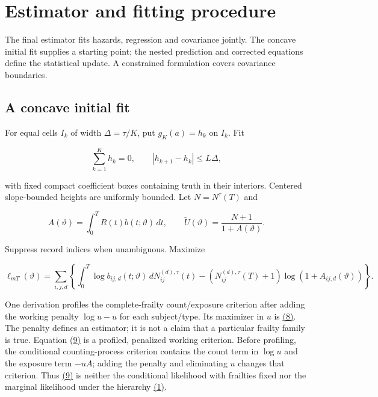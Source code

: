 \documentclass[11pt]{article}
\begin{document}
\section{Estimator and fitting procedure}\label{sec:3}

The final estimator fits hazards, regression and covariance jointly. The concave initial fit supplies a starting point; the nested prediction and corrected equations define the statistical update. A constrained formulation covers covariance boundaries.

\subsection{A concave initial fit}\label{sec:3.1}

For equal cells \(I_k\) of width \(\Delta=\tau/K\), put \(g_K(a)=h_k\) on \(I_k\). Fit

\begin{equation*}
\sum_{k=1}^K h_k=0,\qquad |h_{k+1}-h_k|\leq L\Delta,\tag{7}\label{eq:7}
\end{equation*}

with fixed compact coefficient boxes containing truth in their interiors. Centered slope-bounded heights are uniformly bounded. Let \(N=N^\tau(T)\) and

\begin{equation*}
A(\vartheta)=\int_0^T R(t)b(t;\vartheta)\,dt,\qquad
\widetilde U(\vartheta)=\frac{N+1}{1+A(\vartheta)}.
\tag{8}\label{eq:8}
\end{equation*}

Suppress record indices when unambiguous. Maximize

\begin{equation*}
\ell_{mT}(\vartheta)=
\sum_{i,j,d}\left\{\int_0^T\log b_{ij,d}(t;\vartheta)\,dN_{ij}^{(d),\tau}(t)
-(N_{ij}^{(d),\tau}(T)+1)\log(1+A_{ij,d}(\vartheta))\right\}.
\tag{9}\label{eq:9}
\end{equation*}

One derivation profiles the complete-frailty count/exposure criterion after adding the working penalty \(\log u-u\) for each subject/type. Its maximizer in \(u\) is \hyperref[eq:8]{(8)}. The penalty defines an estimator; it is not a claim that a particular frailty family is true. Equation \hyperref[eq:9]{(9)} is a profiled, penalized working criterion. Before profiling, the conditional counting-process criterion contains the count term in \(\log u\) and the exposure term \(-uA\); adding the penalty and eliminating \(u\) changes that criterion. Thus \hyperref[eq:9]{(9)} is neither the conditional likelihood with frailties fixed nor the marginal likelihood under the hierarchy \hyperref[eq:1]{(1)}.
\end{document}

